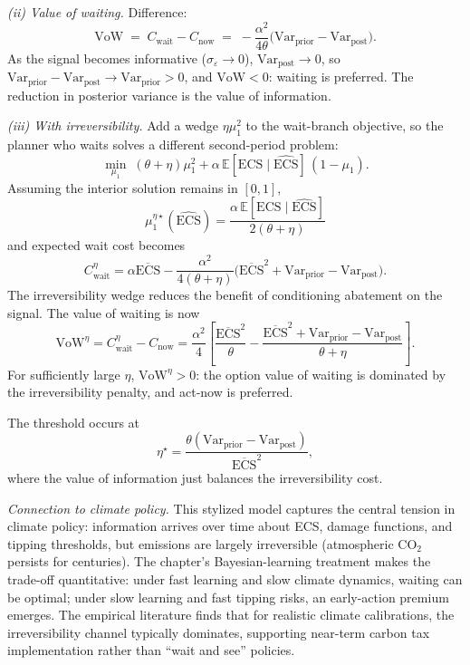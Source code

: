 \documentclass[11pt,a4paper]{report}
\begin{document}
\emph{(ii) Value of waiting.}  Difference:
\[
   \mathrm{VoW} \;=\; C_\mathrm{wait} - C_\mathrm{now}
   \;=\; -\frac{\alpha^2}{4\theta}\bigl(\mathrm{Var}_\mathrm{prior} - \mathrm{Var}_\mathrm{post}\bigr).
\]
As the signal becomes informative ($\sigma_\varepsilon \to 0$), $\mathrm{Var}_\mathrm{post} \to 0$, so $\mathrm{Var}_\mathrm{prior} - \mathrm{Var}_\mathrm{post} \to \mathrm{Var}_\mathrm{prior} > 0$, and $\mathrm{VoW} < 0$: waiting is preferred.  The reduction in posterior variance is the value of information.

\emph{(iii) With irreversibility.}  Add a wedge $\eta\mu_1^2$ to the wait-branch objective, so the planner who waits solves a different second-period problem:
\[
   \min_{\mu_1}\;(\theta+\eta)\mu_1^2
   +\alpha\,\mathbb{E}[\mathrm{ECS}\mid\widehat{\mathrm{ECS}}]\,(1-\mu_1).
\]
Assuming the interior solution remains in $[0,1]$,
\[
   \mu_1^{\eta\star}(\widehat{\mathrm{ECS}})
   =
   \frac{\alpha\,\mathbb{E}[\mathrm{ECS}\mid\widehat{\mathrm{ECS}}]}{2(\theta+\eta)}
\]
and expected wait cost becomes
\[
   C_\mathrm{wait}^\eta
   =
   \alpha \overline{\mathrm{ECS}}
   - \frac{\alpha^2}{4(\theta+\eta)}
   \bigl(\overline{\mathrm{ECS}}^2+\mathrm{Var}_\mathrm{prior}-\mathrm{Var}_\mathrm{post}\bigr).
\]
The irreversibility wedge reduces the benefit of conditioning abatement on the signal.  The value of waiting is now
\[
   \mathrm{VoW}^\eta
   =
   C_\mathrm{wait}^\eta - C_\mathrm{now}
   =
   \frac{\alpha^2}{4}
   \left[
      \frac{\overline{\mathrm{ECS}}^2}{\theta}
      -
      \frac{\overline{\mathrm{ECS}}^2+\mathrm{Var}_\mathrm{prior}-\mathrm{Var}_\mathrm{post}}{\theta+\eta}
   \right].
\]
For sufficiently large $\eta$, $\mathrm{VoW}^\eta>0$: the option value of waiting is dominated by the irreversibility penalty, and act-now is preferred.

The threshold occurs at
\[
   \eta^\star
   =
   \frac{\theta(\mathrm{Var}_\mathrm{prior}-\mathrm{Var}_\mathrm{post})}
        {\overline{\mathrm{ECS}}^2},
\]
where the value of information just balances the irreversibility cost.

\emph{Connection to climate policy.}  This stylized model captures the central tension in climate policy: information arrives over time about ECS, damage functions, and tipping thresholds, but emissions are largely irreversible (atmospheric CO$_2$ persists for centuries).  The chapter's Bayesian-learning treatment makes the trade-off quantitative: under fast learning and slow climate dynamics, waiting can be optimal; under slow learning and fast tipping risks, an early-action premium emerges.  The empirical literature \citep{pindyck2007uncertainty, caiSocialCostCarbon2019} finds that for realistic climate calibrations, the irreversibility channel typically dominates, supporting near-term carbon tax implementation rather than ``wait and see'' policies.
\end{document}

